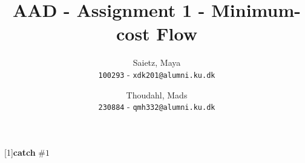 \usepackage[utf8]{inputenc}
\usepackage[a4paper, margin=12mm]{geometry}
\usepackage{subcaption}
\usepackage{graphicx}
\usepackage{tabularx}
\usepackage{subfiles}
\usepackage{amsmath}
\usepackage{amssymb}
\usepackage{hyperref}
\usepackage{algorithm}
\usepackage{algpseudocode}
\usepackage{parskip}
\usepackage[english]{babel}
\usepackage{tikz, pgf}
\usetikzlibrary{arrows,positioning}
\newcommand{\degre}{\ensuremath{^\circ}}

\algnewcommand{}
[1]{\textbf{catch} \( \mbox{#1} \)}{}


\title{AAD - Assignment 1 - Minimum-cost Flow }

\author{
  Saietz, Maya\\
  \texttt{100293} \--
  \texttt{xdk201@alumni.ku.dk}
  \and
  Thoudahl, Mads\\
  \texttt{230884} \--
  \texttt{qmh332@alumni.ku.dk}
}
